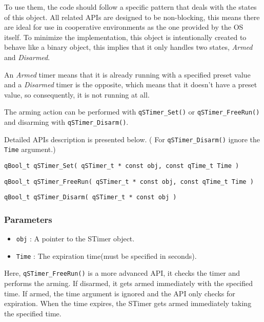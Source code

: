To use them, the code should follow a specific pattern that deals with the states of this object. All related APIs are designed to be non-blocking, this means there are ideal for use in cooperative environments as the one provided by the OS itself. To minimize the implementation, this object is intentionally created to behave like a binary object, this implies that it only handles two states, \textit{Armed} and \textit{Disarmed}. 
\medskip

An \textit{Armed} timer means that it is already running with a specified preset value and a \textit{Disarmed} timer is the opposite, which means that it doesn't have a preset value, so consequently, it is not running at all.

The arming action can be performed with \lstinline{qSTimer_Set()}  or \lstinline{qSTimer_FreeRun()}  and disarming with \lstinline{qSTimer_Disarm()}. 
\medskip

Detailed APIs description is presented below. ( For \lstinline{qSTimer_Disarm()} ignore the \lstinline{Time} argument.)
\medskip

\begin{lstlisting}[style=CStyle]
qBool_t qSTimer_Set( qSTimer_t * const obj, const qTime_t Time )
\end{lstlisting}

\begin{lstlisting}[style=CStyle]
qBool_t qSTimer_FreeRun( qSTimer_t * const obj, const qTime_t Time )
\end{lstlisting}

\begin{lstlisting}[style=CStyle]
qBool_t qSTimer_Disarm( qSTimer_t * const obj )
\end{lstlisting}

\subsubsection*{Parameters}
\begin{itemize}
    \item \lstinline{obj} : A pointer to the STimer object. 
    \item \lstinline{Time} : The expiration time(must be specified in seconds).
\end{itemize}

Here, \lstinline{qSTimer_FreeRun()} is a more advanced API, it checks the timer and performs the arming. If disarmed, it gets armed immediately with the specified time. If armed, the time argument is ignored and the API only checks for expiration. When the time expires, the STimer gets armed immediately taking the specified time.

